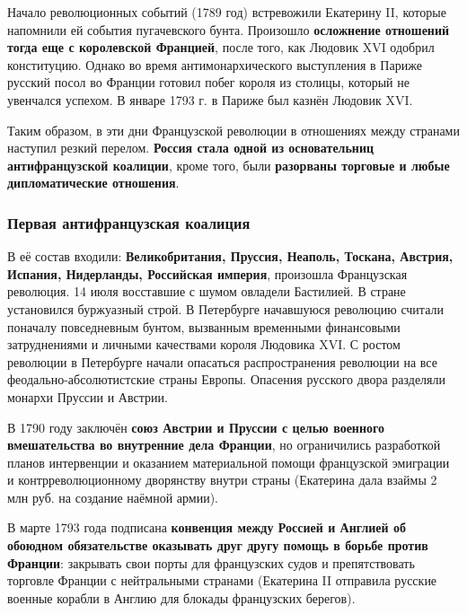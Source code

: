 \documentclass{article}
\begin{document}
\hfill

Начало революционных событий (1789 год) встревожили Екатерину II, которые напомнили ей события пугачевского бунта. Произошло \textbf{осложнение отношений тогда еще с королевской Францией}, после того, как Людовик XVI одобрил конституцию. Однако во время антимонархического выступления в Париже русский посол во Франции готовил побег короля из столицы, который не увенчался успехом. В январе 1793 г. в Париже был казнён Людовик XVI.

\hfill

Таким образом, в эти дни Французской революции в отношениях между странами наступил резкий перелом. \textbf{Россия стала одной из основательниц антифранцузской коалиции}, кроме того, были \textbf{разорваны торговые и любые дипломатические отношения}.

\subsubsection{Первая антифранцузская коалиция}

В её состав входили: \textbf{Великобритания, Пруссия, Неаполь, Тоскана, Австрия, Испания, Нидерланды, Российская империя}, произошла Французская революция. 14 июля восставшие с шумом овладели Бастилией. В стране установился буржуазный строй. В Петербурге начавшуюся революцию считали поначалу повседневным бунтом, вызванным временными финансовыми затруднениями и личными качествами короля Людовика XVI. С ростом революции в Петербурге начали опасаться распространения революции на все феодально-абсолютистские страны Европы. Опасения русского двора разделяли монархи Пруссии и Австрии.

\hfill

В 1790 году заключён \textbf{союз Австрии и Пруссии с целью военного вмешательства во внутренние дела Франции}, но ограничились разработкой планов интервенции и оказанием материальной помощи французской эмиграции и контрреволюционному дворянству внутри страны (Екатерина дала взаймы 2 млн руб. на создание наёмной армии).

\hfill

В марте 1793 года подписана \textbf{конвенция между Россией и Англией об обоюдном обязательстве оказывать друг другу помощь в борьбе против Франции}: закрывать свои порты для французских судов и препятствовать торговле Франции с нейтральными странами (Екатерина II отправила русские военные корабли в Англию для блокады французских берегов). 
\end{document}
